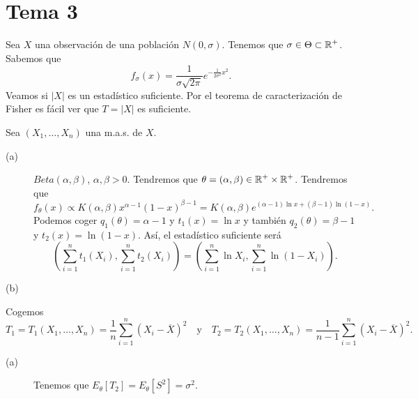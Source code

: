 \section{Tema 3}
\begin{eg}[Ejercicio 1]
	Sea $\displaystyle X $ una observación de una población $\displaystyle N\left(0, \sigma \right) $. Tenemos que $\displaystyle \sigma \in \Theta \subset \mathbb{R}^{+} $. Sabemos que 
	\[f_{\sigma }\left(x\right)=\frac{1}{\sigma\sqrt{2\pi }}e^{-\frac{1}{2\sigma^{2}}x^{2}} .\]
Veamos si $\displaystyle \left|X\right| $ es un estadístico suficiente. Por el teorema de caracterización de Fisher es fácil ver que $\displaystyle T = \left|X\right| $ es suficiente.
\end{eg}
\begin{eg}[Ejercicio 2]
	Sea $\displaystyle \left(X_{1}, \ldots, X_{n}\right) $ una m.a.s. de $\displaystyle X $. 
	\begin{description}
	\item[(a)] $\displaystyle Beta\left(\alpha, \beta \right) $, $\displaystyle \alpha, \beta > 0 $. Tendremos que $\displaystyle \theta = \left(\alpha, \beta \right)\in \mathbb{R}^{+} \times \mathbb{R}^{+} $. Tendremos que  
		\[ f_{\theta}\left(x\right)\propto K\left(\alpha, \beta \right)x^{\alpha-1}\left(1-x\right)^{\beta-1} = K\left(\alpha, \beta \right)e^{\left(\alpha - 1\right)\ln x + \left(\beta-1\right)\ln \left(1-x\right)} .\]
	Podemos coger $\displaystyle q_{1}\left(\theta \right)=\alpha-1 $ y $\displaystyle t_{1}\left(x\right)=\ln x $ y también $\displaystyle q_{2}\left(\theta\right)=\beta-1 $ y $\displaystyle t_{2}\left(x\right)=\ln\left(1-x\right) $. Así, el estadístico suficiente será
	\[ \left(\sum^{n}_{i=1}t_{1}\left(X_{i}\right), \sum^{n}_{i=1}t_{2}\left(X_{i}\right)\right)=\left(\sum^{n}_{i= 1}\ln X_{i}, \sum^{n}_{i=1}\ln\left(1-X_{i}\right)\right) .\]
\item[(b)] 
	\end{description}
\end{eg}
\begin{eg}[Ejercicio 10]
Cogemos 
\[T_{1}=T_{1}\left(X_{1}, \ldots, X_{n}\right)=\frac{1}{n}\sum^{n}_{i = 1}\left(X_{i}-\overline{X}\right)^{2} \quad \text{y} \quad T_{2}=T_{2}\left(X_{1}, \ldots, X_{n}\right)=\frac{1}{n-1}\sum^{n}_{i = 1}\left(X_{i}-\overline{X}\right)^{2} .\]
\begin{description}
	\item[(a)] Tenemos que $\displaystyle E_{\theta}\left[T_{2}\right] =E_{\theta}\left[S^{2}\right] =\sigma^{2} $. 
\end{description}

\end{eg}

